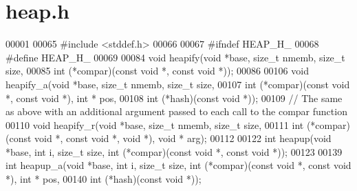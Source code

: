 \section{heap.\+h}
\label{heap_8h_source}

\begin{DoxyCode}
00001 
00065 \textcolor{preprocessor}{#include <stddef.h>}
00066 
00067 \textcolor{preprocessor}{#ifndef HEAP\_H\_}
00068 \textcolor{preprocessor}{#define HEAP\_H\_}
00069 
00084 \textcolor{keywordtype}{void} heapify(\textcolor{keywordtype}{void} *base, \textcolor{keywordtype}{size\_t} nmemb, \textcolor{keywordtype}{size\_t} size,
00085                 \textcolor{keywordtype}{int} (*compar)(\textcolor{keyword}{const} \textcolor{keywordtype}{void} *, \textcolor{keyword}{const} \textcolor{keywordtype}{void} *));
00086 
00106 \textcolor{keywordtype}{void} heapify_a(\textcolor{keywordtype}{void} *base, \textcolor{keywordtype}{size\_t} nmemb, \textcolor{keywordtype}{size\_t} size,
00107                 \textcolor{keywordtype}{int} (*compar)(\textcolor{keyword}{const} \textcolor{keywordtype}{void} *, \textcolor{keyword}{const} \textcolor{keywordtype}{void} *), \textcolor{keywordtype}{int} * pos,
00108                 \textcolor{keywordtype}{int} (*hash)(\textcolor{keyword}{const} \textcolor{keywordtype}{void} *));
00109 \textcolor{comment}{// The same as above with an additional argument passed to each call to the compar function}
00110 \textcolor{keywordtype}{void} heapify\_r(\textcolor{keywordtype}{void} *base, \textcolor{keywordtype}{size\_t} nmemb, \textcolor{keywordtype}{size\_t} size,
00111                 \textcolor{keywordtype}{int} (*compar)(\textcolor{keyword}{const} \textcolor{keywordtype}{void} *, \textcolor{keyword}{const} \textcolor{keywordtype}{void} *, \textcolor{keywordtype}{void} *), \textcolor{keywordtype}{void} * arg);
00112 
00122 \textcolor{keywordtype}{int} heapup(\textcolor{keywordtype}{void} *base, \textcolor{keywordtype}{int} i, \textcolor{keywordtype}{size\_t} size,      \textcolor{keywordtype}{int} (*compar)(\textcolor{keyword}{const} \textcolor{keywordtype}{void} *, \textcolor{keyword}{const} \textcolor{keywordtype}{void} *));
00123 
00139 \textcolor{keywordtype}{int} heapup_a(\textcolor{keywordtype}{void} *base, \textcolor{keywordtype}{int} i, \textcolor{keywordtype}{size\_t} size, \textcolor{keywordtype}{int} (*compar)(\textcolor{keyword}{const} \textcolor{keywordtype}{void} *, \textcolor{keyword}{const} \textcolor{keywordtype}{void} *), \textcolor{keywordtype}{int} * pos,
00140                 \textcolor{keywordtype}{int} (*hash)(\textcolor{keyword}{const} \textcolor{keywordtype}{void} *));

\end{DoxyCode}
